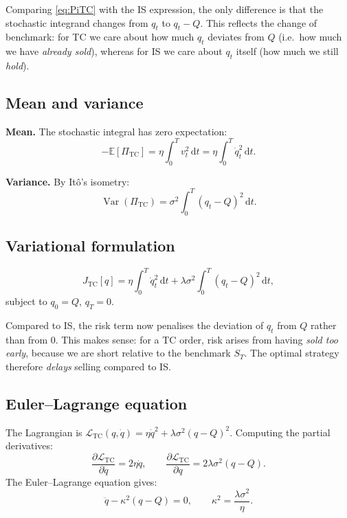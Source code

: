 \documentclass[12pt, a4paper]{article}
\newcommand{\E}{\mathbb{E}}
\newcommand{\Var}{\operatorname{Var}}
\newcommand{\dd}{\,\mathrm{d}}
\newcommand{\kap}{\kappa}
\begin{document}
\begin{keybox}
  Comparing \eqref{eq:PiTC} with the IS expression,
  the only difference is that the stochastic integrand changes from $q_t$ to $q_t - Q$.
  This reflects the change of benchmark: for TC we care about
  how much $q_t$ deviates from $Q$ (i.e.\ how much we have \emph{already sold}),
  whereas for IS we care about $q_t$ itself (how much we still \emph{hold}).
\end{keybox}

\subsection{Mean and variance}

\textbf{Mean.} The stochastic integral has zero expectation:
\[
  -\E[\Pi_{\mathrm{TC}}] = \eta\!\int_0^T v_t^2 \dd t = \eta\!\int_0^T \dot q_t^2 \dd t.
\]

\textbf{Variance.} By It\^{o}'s isometry:
\[
  \Var(\Pi_{\mathrm{TC}})
  = \sigma^2\!\int_0^T (q_t - Q)^2 \dd t.
\]

\subsection{Variational formulation}

\begin{equation}
  J_{\mathrm{TC}}[q]
  = \eta\!\int_0^T \dot q_t^2 \dd t + \lambda\sigma^2\!\int_0^T (q_t - Q)^2 \dd t,
  \label{eq:JTC}
\end{equation}
subject to $q_0 = Q$, $q_T = 0$.

\begin{notebox}
  Compared to IS, the risk term now penalises the deviation of $q_t$ from $Q$
  rather than from $0$. This makes sense: for a TC order, risk arises from
  having \emph{sold too early}, because we are short relative to the benchmark $S_T$.
  The optimal strategy therefore \emph{delays} selling compared to IS.
\end{notebox}

\subsection{Euler--Lagrange equation}

The Lagrangian is $\mathcal{L}_{\mathrm{TC}}(q, \dot q) = \eta\dot q^2 + \lambda\sigma^2(q - Q)^2$.
Computing the partial derivatives:
\[
  \frac{\partial\mathcal{L}_{\mathrm{TC}}}{\partial\dot q} = 2\eta\dot q,
  \qquad
  \frac{\partial\mathcal{L}_{\mathrm{TC}}}{\partial q} = 2\lambda\sigma^2(q - Q).
\]
The Euler--Lagrange equation gives:
\[
  \ddot q - \kap^2(q - Q) = 0, \qquad \kap^2 = \frac{\lambda\sigma^2}{\eta}.
\]
\end{document}
